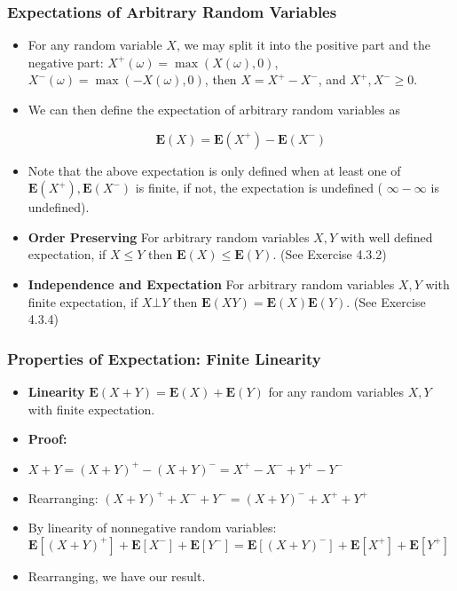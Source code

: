 \documentclass[handout]{beamer}
\newcommand{\BE}{\mathbf{E}}
\begin{document}
\frame
{
  \frametitle{Expectations of Arbitrary Random Variables}

\begin{itemize}


                         
\item<1-> For any random variable $X$, we may split it into the positive part and the negative part: $X^{+}(\omega) =\max(X(\omega), 0)$, $X^{-}(\omega) =\max(-X(\omega), 0)$, then $X=X^{+}-X^-$, and $X^+, X^-\geq 0$.
                         
\item<2-> We can then define the expectation of arbitrary random variables as 
                                                  
                                                  $$\BE(X)=\BE(X^+)-\BE(X^-)$$
                                                                           
\item<3->  Note that the above expectation is only defined when at least one of  $\BE(X^+), \BE(X^-)$ is finite, if not, the expectation is undefined ( $\infty-\infty$ is undefined).                         
                              
\item<4-> \textbf{Order Preserving} For arbitrary random variables $X, Y$ with well defined expectation, if $X\leq Y$ then $\BE(X)\leq \BE(Y)$. (See Exercise 4.3.2)

\item<5-> \textbf{Independence and Expectation} For arbitrary random variables $X, Y$ with finite expectation, if $X\bot Y$ then $\BE(XY)=\BE(X) \BE(Y)$. (See Exercise 4.3.4)

                                          
\end{itemize}
}

\frame
{
  \frametitle{Properties of Expectation: Finite Linearity}

   \begin{itemize}

 \item<1-> \textbf{Linearity} $\BE(X+Y)=\BE(X)+\BE(Y)$ for any random variables $X, Y$ with finite expectation.
  
   \item<2-> \textbf{Proof:}  

 \item<3->[-] $X + Y = (X+Y)^+ - (X+Y)^- = X^+ - X^- + Y^+ - Y^-$
 
 \item<4->[-] Rearranging: $(X+Y)^+ + X^- + Y^- = (X+Y)^- + X^+ + Y^+ $
 
 \item<5->[-] By linearity of nonnegative random variables: $\BE[(X+Y)^+] + \BE[X^-] + \BE[Y^-] = \BE[(X+Y)^-] + \BE[X^+] + \BE[Y^+] $
 
 
 \item<6->[-] Rearranging, we have our result.
   
\end{itemize}
}
\end{document}
